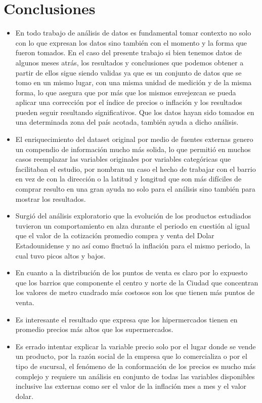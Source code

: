 
\section{Conclusiones}

\begin{itemize}
  \item En todo trabajo de análisis de datos es fundamental tomar contexto no solo con lo que expresan los datos sino también con el momento y la forma que fueron tomados. En el caso del presente trabajo si bien tenemos datos de algunos meses atrás, los resultados y conclusiones que podemos obtener a partir de ellos sigue siendo validas ya que es un conjunto de datos que se tomo en un mismo lugar, con una misma unidad de medición y de la misma forma, lo que asegura que por más que los mismos envejezcan se pueda aplicar una corrección por el índice de precios o inflación y los resultados pueden seguir resultando significativos. Que los datos hayan sido tomados en una determinada zona del país acotada, también ayuda a dicho análisis.
  \item El enriquecimiento del dataset original por medio de fuentes externas genero un compendio de información mucho más solida, lo que permitió en muchos casos reemplazar las variables originales por variables categóricas que facilitaban el estudio, por nombran un caso el hecho de trabajar con el barrio en vez de con la dirección o la latitud y longitud que son más difíciles de comprar resulto en una gran ayuda no solo para el análisis sino también para mostrar los resultados.
  \item Surgió del análisis exploratorio que la evolución de los productos estudiados tuvieron un comportamiento en alza durante el periodo en cuestión al igual que el valor de la cotización promedio compra y venta del Dolar Estadounidense y no así como fluctuó la inflación para el mismo periodo, la cual tuvo picos altos y bajos.
  \item En cuanto a la distribución de los puntos de venta es claro por lo expuesto que los barrios que componente el centro y norte de la Ciudad que concentran los valores de metro cuadrado más costosos son los que tienen más puntos de venta.
  \item Es interesante el resultado que expresa que los hipermercados tienen en promedio precios más altos que los supermercados.
  \item Es errado intentar explicar la variable precio solo por el lugar donde se vende un producto, por la razón social de la empresa que lo comercializa o por el tipo de sucursal, el fenómeno de la conformación de los precios es mucho más complejo y requiere un análisis en conjunto de todas las variables disponibles inclusive las externas como ser el valor de la inflación mes a mes y el valor dolar.

\end{itemize}
